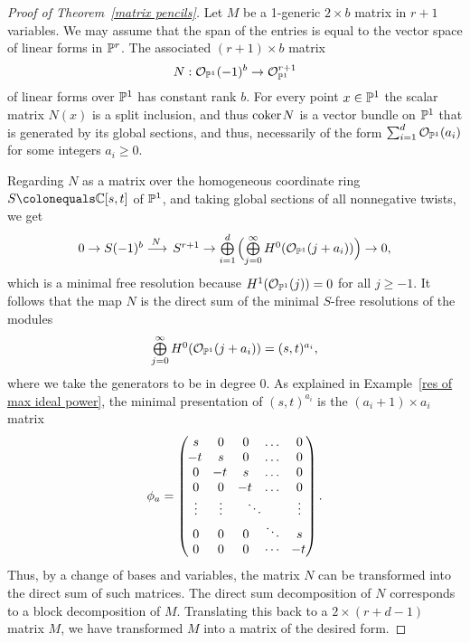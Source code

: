 \begin{proof}[Proof of Theorem~\ref{matrix pencils}]
Let $M$ be a 1-generic $2\times b$ matrix in $r+1$ variables. We may
assume that the span of the entries
is equal to the vector space of linear forms in ${\mathbb P}^{r}$. The associated
$(r+1)\times b$ matrix
$$
N: {\mathcal O}_{{\mathbb P}^{1}}(-1)^{b} \to {\mathcal O}_{{\mathbb P}^{1}}^{r+1}
$$
of linear forms over ${\mathbb P}^{1}$ has constant rank $b$.
For every point $x\in {\mathbb P}^{1}$ the scalar matrix $N(x)$ is a split
inclusion, and thus
${\rm{coker}\kern1pt} N$ is a vector bundle on ${\mathbb P}^{1}$ that is generated by its global sections, and thus, necessarily of the form $\sum_{i
=1}^{d}{\mathcal O}_{{\mathbb P}^{1}}(a_{i})$ for some
integers $a_{i}\geq 0$.

Regarding $N$ as a matrix over the homogeneous coordinate ring $S\colonequals \CC[s,t]$ of ${\mathbb P}^{1}$, and taking global sections of all
nonnegative twists, we get
$$
\tsty
0\to S(-1)^{b} \ruto {\,N}
S^{r+1}  \to \bigoplus\limits_{i = 1}^{d}\,\Bigl(
\bigoplus\limits_{j=0}^{\infty}H^{0}(\sO_{\PP^{1}}(j+a_{i}))\Bigr)\to 0,
$$
which is a minimal free resolution because $H^{1}({\mathcal O}_{{\mathbb P}^{1}}(j)) = 0$ for all $j\geq -1$.
It follows that the map $N$ is the direct
sum of the minimal $S$-free resolutions
of the modules
$$
\textstyle
\bigoplus\limits_{j=0}^{\infty}H^{0}({\mathcal O}_{{\mathbb P}^{1}}(j+a_{i})) = (s,t)^{a_{i}},
$$
where we take the generators to be in degree 0.
As explained in Example~\ref{res of max ideal power}, the minimal
presentation of $(s,t)^{a_{i}}$ is the $(a_{i}+1)\times a_{i}$ matrix
\label{phia}$$
\phi_a=
\left(\,
\begin{matrix}
s&0&0&\dots&0\\
\!-t&s&0&\dots&0\\
0&\!-t&s&\dots&0\\
0&0&\!-t&\dots&0\\
\vdots&\vdots&\rlap{\,$\ddots$}&&\vdots\\
0&0&0&\ddots&s\\
0&0&0&\cdots&\!-t\\
\end{matrix}
\right)
.
$$
 Thus, by a change of bases and variables, the matrix $N$ can be
transformed into the direct sum of such matrices.
The direct sum decomposition of $N$ corresponds to a block decomposition
of $M$. Translating this
back to a $2\times (r+d-1)$ matrix $M$, we have
transformed $M$ into a matrix of
the desired form.
\end{proof}

